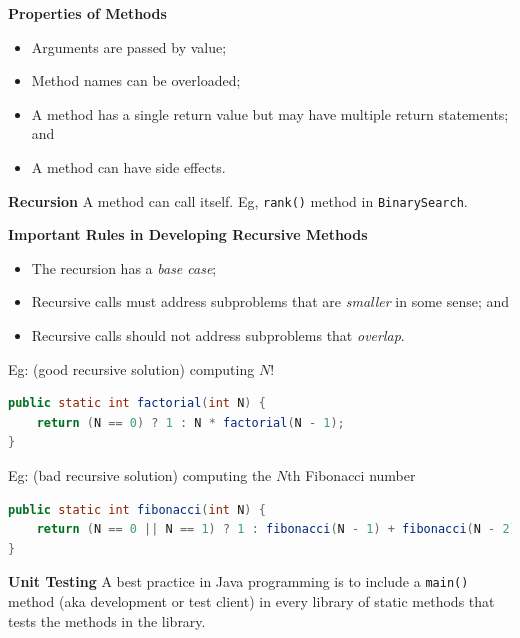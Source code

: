 \documentclass[8pt,a4paper,compress]{beamer}
\begin{document}
\begin{frame}[fragile]
\pause

\textbf{Properties of Methods}
\begin{itemize}
\item Arguments are passed by value; 
\item Method names can be overloaded; 
\item A method has a single return value but may have multiple return statements; and
\item A method can have side effects.
\end{itemize}

\pause
\smallskip

\textbf{Recursion} A method can call itself. Eg, \lstinline$rank()$ method in \lstinline$BinarySearch$. 

\pause
\smallskip

\textbf{Important Rules in Developing Recursive Methods}
\begin{itemize}
\item The recursion has a \emph{base case}; 
\item Recursive calls must address subproblems that are \emph{smaller} in some sense; and
\item Recursive calls should not address subproblems that \emph{overlap}.
\end{itemize}

\pause

Eg: (good recursive solution) computing $N!$

\begin{lstlisting}[language=Java]
public static int factorial(int N) {
    return (N == 0) ? 1 : N * factorial(N - 1); 
}
\end{lstlisting}

\pause

Eg: (bad recursive solution) computing the $N$th Fibonacci number
\begin{lstlisting}[language=Java]
public static int fibonacci(int N) {
    return (N == 0 || N == 1) ? 1 : fibonacci(N - 1) + fibonacci(N - 2); 
}
\end{lstlisting}

\pause
\smallskip

\textbf{Unit Testing} A best practice in Java programming is to include a \lstinline$main()$ method (aka development or test client) in every library of static methods that tests the methods in the library.

\end{frame}
\end{document}
